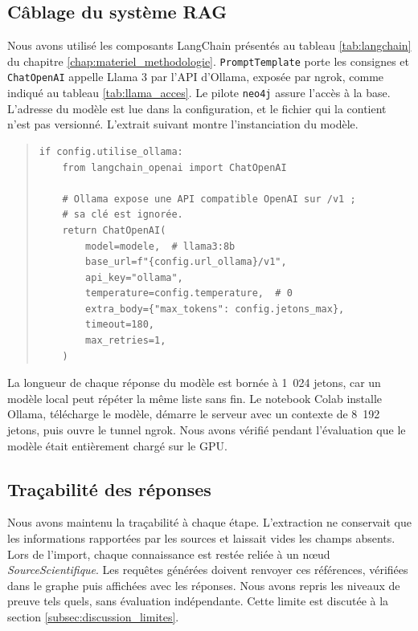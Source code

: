 \subsection{Câblage du système RAG}
\label{subsec:cablage_rag}

Nous avons utilisé les composants LangChain présentés au tableau \ref{tab:langchain} du chapitre \ref{chap:materiel_methodologie}. \texttt{PromptTemplate} porte les consignes et \texttt{ChatOpenAI} appelle Llama 3 par l'API d'Ollama, exposée par ngrok, comme indiqué au tableau \ref{tab:llama_acces}. Le pilote \texttt{neo4j} assure l'accès à la base. L'adresse du modèle est lue dans la configuration, et le fichier qui la contient n'est pas versionné. L'extrait suivant montre l'instanciation du modèle.

\begin{quote}
\begin{verbatim}
if config.utilise_ollama:
    from langchain_openai import ChatOpenAI

    # Ollama expose une API compatible OpenAI sur /v1 ;
    # sa clé est ignorée.
    return ChatOpenAI(
        model=modele,  # llama3:8b
        base_url=f"{config.url_ollama}/v1",
        api_key="ollama",
        temperature=config.temperature,  # 0
        extra_body={"max_tokens": config.jetons_max},
        timeout=180,
        max_retries=1,
    )
\end{verbatim}
\end{quote}

La longueur de chaque réponse du modèle est bornée à 1~024 jetons, car un modèle local peut répéter la même liste sans fin. Le notebook Colab installe Ollama, télécharge le modèle, démarre le serveur avec un contexte de 8~192 jetons, puis ouvre le tunnel ngrok. Nous avons vérifié pendant l'évaluation que le modèle était entièrement chargé sur le GPU.

\subsection{Traçabilité des réponses}
\label{subsec:tracabilite_reponses}

Nous avons maintenu la traçabilité à chaque étape. L'extraction ne conservait que les informations rapportées par les sources et laissait vides les champs absents. Lors de l'import, chaque connaissance est restée reliée à un nœud \textit{SourceScientifique}. Les requêtes générées doivent renvoyer ces références, vérifiées dans le graphe puis affichées avec les réponses. Nous avons repris les niveaux de preuve tels quels, sans évaluation indépendante. Cette limite est discutée à la section \ref{subsec:discussion_limites}.

